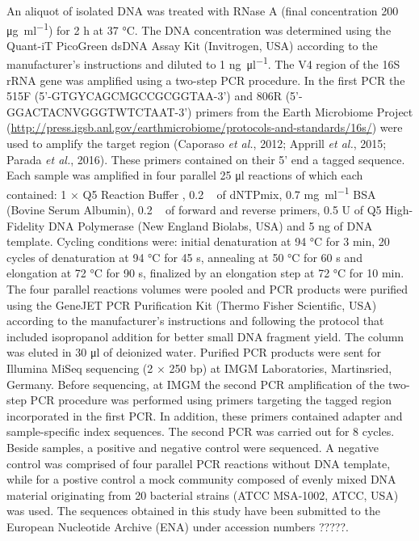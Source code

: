 \documentclass[12pt,]{article}
\begin{document}
An aliquot of isolated DNA was treated with RNase A (final concentration
200 \si{\ug\per\ml}) for 2 \si{\hour} at 37 \si{\degreeCelsius}. The DNA
concentration was determined using the Quant-iT PicoGreen dsDNA Assay
Kit (Invitrogen, USA) according to the manufacturer's instructions and
diluted to 1 \si{\ng\per\ul}. The V4 region of the 16S rRNA gene was
amplified using a two-step PCR procedure. In the first PCR the 515F
(5'-GTGYCAGCMGCCGCGGTAA-3') and 806R (5'-GGACTACNVGGGTWTCTAAT-3')
primers from the Earth Microbiome Project
(\url{http://press.igsb.anl.gov/earthmicrobiome/protocols-and-standards/16s/})
were used to amplify the target region (Caporaso \emph{et al.}, 2012;
Apprill \emph{et al.}, 2015; Parada \emph{et al.}, 2016). These primers
contained on their 5' end a tagged sequence. Each sample was amplified
in four parallel 25 \si{\ul} reactions of which each contained: 1 × Q5
Reaction Buffer , 0.2 \si{\milli\Molar} of dNTPmix, 0.7 \si{\mg\per\ml}
BSA (Bovine Serum Albumin), 0.2 \si{\micro\Molar} of forward and reverse
primers, 0.5 U of Q5 High-Fidelity DNA Polymerase (New England Biolabs,
USA) and 5 \si{\ng} of DNA template. Cycling conditions were: initial
denaturation at 94 \si{\degreeCelsius} for 3 \si{\minute}, 20 cycles of
denaturation at 94 \si{\degreeCelsius} for 45 \si{\s}, annealing at 50
\si{\degreeCelsius} for 60 \si{\s} and elongation at 72
\si{\degreeCelsius} for 90 \si{\s}, finalized by an elongation step at
72 \si{\degreeCelsius} for 10 \si{\minute}. The four parallel reactions
volumes were pooled and PCR products were purified using the GeneJET PCR
Purification Kit (Thermo Fisher Scientific, USA) according to the
manufacturer's instructions and following the protocol that included
isopropanol addition for better small DNA fragment yield. The column was
eluted in 30 \si{\ul} of deionized water. Purified PCR products were
sent for Illumina MiSeq sequencing (2 × 250 bp) at IMGM Laboratories,
Martinsried, Germany. Before sequencing, at IMGM the second PCR
amplification of the two-step PCR procedure was performed using primers
targeting the tagged region incorporated in the first PCR. In addition,
these primers contained adapter and sample-specific index sequences. The
second PCR was carried out for 8 cycles. Beside samples, a positive and
negative control were sequenced. A negative control was comprised of
four parallel PCR reactions without DNA template, while for a postive
control a mock community composed of evenly mixed DNA material
originating from 20 bacterial strains (ATCC MSA-1002, ATCC, USA) was
used. The sequences obtained in this study have been submitted to the
European Nucleotide Archive (ENA) under accession numbers ?????.
\end{document}
